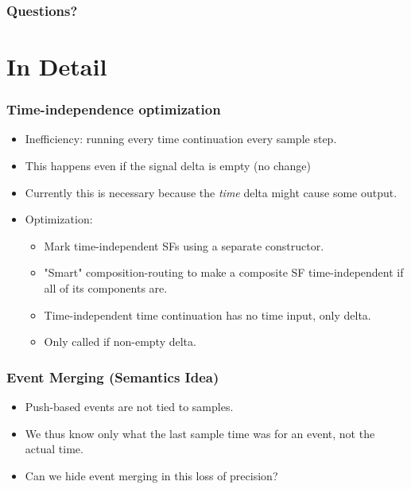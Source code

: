 \documentclass{beamer}
\begin{document}
\begin{frame}
\frametitle{Questions?}
\end{frame}

\section{In Detail}

\begin{frame}
\frametitle{Time-independence optimization}
    \begin{itemize}
        \item Inefficiency: running every time continuation every sample step.
        \item This happens even if the signal delta is empty (no change)
        \item Currently this is necessary because the {\em time} delta might
              cause some output.
        \item Optimization:
        \begin{itemize}
            \item Mark time-independent SFs using a separate constructor.
            \item "Smart" composition-routing to make a composite SF time-independent
                  if all of its components are.
            \item Time-independent time continuation has no time input, only delta.
            \item Only called if non-empty delta. 
        \end{itemize}
    \end{itemize}
\end{frame}

\begin{frame}
\frametitle{Event Merging (Semantics Idea)}
    \begin{itemize}
        \item Push-based events are not tied to samples.
        \item We thus know only what the last sample time was for an event,
              not the actual time.
        \item Can we hide event merging in this loss of precision?
    \end{itemize}
\end{frame}
\end{document}
